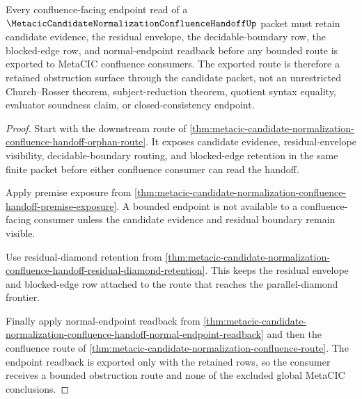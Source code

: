 \begin{theorem}\label{thm:metacic-candidate-normalization-residual-obstruction-retention}
Every confluence-facing endpoint read of a $\MetacicCandidateNormalizationConfluenceHandoffUp$ packet must retain candidate evidence, the residual envelope, the decidable-boundary row, the blocked-edge row, and normal-endpoint readback before any bounded route is exported to MetaCIC confluence consumers. The exported route is therefore a retained obstruction surface through the candidate packet, not an unrestricted Church--Rosser theorem, subject-reduction theorem, quotient syntax equality, evaluator soundness claim, or closed-consistency endpoint.
\end{theorem}
\begin{proof}
Start with the downstream route of \autoref{thm:metacic-candidate-normalization-confluence-handoff-orphan-route}. It exposes candidate evidence, residual-envelope visibility, decidable-boundary routing, and blocked-edge retention in the same finite packet before either confluence consumer can read the handoff.

Apply premise exposure from \autoref{thm:metacic-candidate-normalization-confluence-handoff-premise-exposure}. A bounded endpoint is not available to a confluence-facing consumer unless the candidate evidence and residual boundary remain visible.

Use residual-diamond retention from \autoref{thm:metacic-candidate-normalization-confluence-handoff-residual-diamond-retention}. This keeps the residual envelope and blocked-edge row attached to the route that reaches the parallel-diamond frontier.

Finally apply normal-endpoint readback from \autoref{thm:metacic-candidate-normalization-confluence-handoff-normal-endpoint-readback} and then the confluence route of \autoref{thm:metacic-candidate-normalization-confluence-route}. The endpoint readback is exported only with the retained rows, so the consumer receives a bounded obstruction route and none of the excluded global MetaCIC conclusions.
\end{proof}

